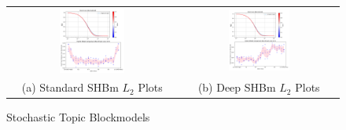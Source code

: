 \begin{singlespacing}
    \begin{figure}
        \centering
        \begin{tabular}{cc}
            \includegraphics[width=0.40\textwidth]{Figures/standard_heat_trace_plot} &
            \includegraphics[width=0.40\textwidth]{Figures/ann_heat_trace_plot} \\
            (a) Standard SHBm $L_{2}$ Plots & (b) Deep SHBm $L_{2}$ Plots\\[6pt]
        \end{tabular}
        \caption[Stochastic Topic Blockmodels]{Stochastic Topic Blockmodels}
        \label{fig:SHBm_results}
    \end{figure}
\end{singlespacing}


